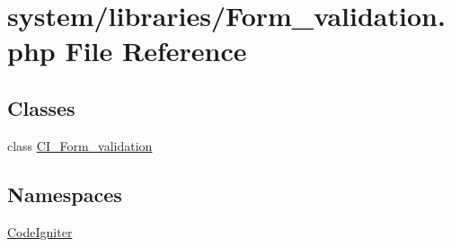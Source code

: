 \hypertarget{_form__validation_8php}{}\section{system/libraries/\+Form\+\_\+validation.php File Reference}
\label{_form__validation_8php}
\subsection*{Classes}
\begin{DoxyCompactItemize}
\item 
class \mbox{\hyperlink{class_c_i___form__validation}{C\+I\+\_\+\+Form\+\_\+validation}}
\end{DoxyCompactItemize}
\subsection*{Namespaces}
\begin{DoxyCompactItemize}
\item 
 \mbox{\hyperlink{namespace_code_igniter}{Code\+Igniter}}
\end{DoxyCompactItemize}

